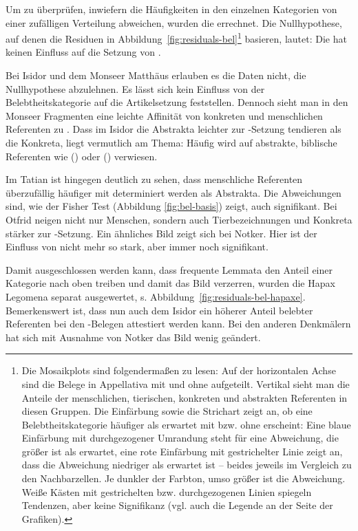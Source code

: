 Um zu überprüfen, inwiefern die Häufigkeiten in den einzelnen Kategorien von einer zufälligen Verteilung abweichen, wurden die  \parencite{Gries2012} errechnet. Die Nullhypothese, auf denen die Residuen in Abbildung~\ref{fig:residuals-bel}\footnote{ 
Die Mosaikplots sind folgendermaßen zu lesen: Auf der horizontalen Achse sind die Belege in Appellativa  mit und ohne  aufgeteilt. Vertikal sieht man die Anteile der menschlichen, tierischen, konkreten und abstrakten Referenten in diesen Gruppen. Die Einfärbung sowie die Strichart zeigt an, ob eine Belebtheitskategorie  häufiger als erwartet mit bzw. ohne  erscheint: Eine blaue Einfärbung mit durchgezogener Umrandung steht für eine Abweichung, die größer ist als erwartet, eine rote Einfärbung mit gestrichelter Linie zeigt an, dass die Abweichung niedriger als erwartet ist -- beides jeweils im Vergleich zu den Nachbarzellen. Je dunkler der Farbton, umso größer ist die Abweichung. Weiße Kästen mit gestrichelten bzw. durchgezogenen Linien spiegeln Tendenzen, aber keine Signifikanz (vgl. auch die Legende an der Seite der Grafiken).} basieren, lautet: Die  hat keinen Einfluss auf die Setzung von . 

Bei Isidor und dem Monseer Matthäus erlauben es die Daten nicht, die Nullhypothese abzulehnen. Es lässt sich kein Einfluss von der Belebtheitskategorie  auf die Artikelsetzung feststellen. Dennoch sieht man in den Monseer Fragmenten eine leichte Affinität von konkreten und menschlichen Referenten zu . Dass im Isidor die Abstrakta  leichter zur -Setzung tendieren als die  Konkreta, liegt vermutlich am Thema: Häufig wird auf abstrakte, biblische Referenten wie  () oder   () verwiesen.
 
Im Tatian ist hingegen deutlich zu sehen, dass menschliche Referenten überzufällig häufiger mit  determiniert werden als  Abstrakta. Die Abweichungen sind, wie der Fisher Test (Abbildung \ref{fig:bel-basis}) zeigt, auch signifikant. Bei Otfrid neigen nicht nur Menschen, sondern auch  Tierbezeichnungen und Konkreta  stärker zur -Setzung. Ein ähnliches Bild zeigt sich bei Notker. Hier ist der Einfluss von  nicht mehr so stark, aber immer noch signifikant.    

Damit ausgeschlossen werden kann, dass frequente Lemmata  den Anteil einer Kategorie nach oben treiben und damit das Bild verzerren, wurden die Hapax Legomena separat ausgewertet, s. Abbildung~\ref{fig:residuals-bel-hapaxe}. Bemerkenswert ist, dass nun auch dem Isidor ein höherer Anteil belebter Referenten bei den -Belegen attestiert werden kann. Bei den anderen Denkmälern hat sich mit Ausnahme von Notker das Bild wenig geändert. 

